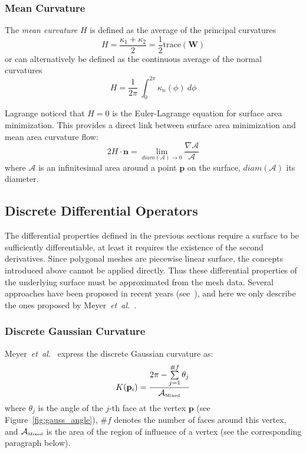 \documentclass{InsightArticle}
\theoremstyle{plain}
\begin{document}
\subsubsection{Mean Curvature}
The \emph{mean curvature} $H$ is defined as the average of the principal curvatures
\begin{equation}
  H = \frac{\kappa_1 + \kappa_2}{2} = \frac{1}{2} \text{trace}(\mathbf{W}) \label{eq:MeanCurvatureDef1}
\end{equation}
or can alternatively be defined as the continuous average of the normal curvatures
\begin{equation}
  H = \frac{1}{2\pi}\ \int_{0}^{2\pi} \kappa_n(\phi)\ d\phi
\end{equation}

Lagrange noticed that $H=0$ is the Euler-Lagrange equation for surface area minimization. This provides a direct link between surface area minimization and mean area curvature flow:
\begin{equation}
  2 H \cdot \mathbf{n} = \lim_{diam(\mathcal{A})\rightarrow 0} \frac{\nabla \mathcal{A}}{\mathcal{A}}
\end{equation}
where $\mathcal{A}$ is an infinitesimal area around a point $\mathbf{p}$ on the surface, $diam(\mathcal{A})$ its diameter.
\subsection{Discrete Differential Operators}
\label{sec:Background:Discrete}

The differential properties defined in the previous sections require a surface to be sufficiently differentiable, at least it requires the existence of the second derivatives. Since polygonal meshes are piecewise linear surface, the concepts introduced above cannot be applied directly. Thus these differential properties of the underlying surface must be approximated from the mesh data. Several approaches have been proposed in recent years (see~\cite{MeshCourse07}), and here we only describe the ones proposed by Meyer~\textit{et~al.}~\cite{Meyer02}.

\subsubsection{Discrete Gaussian Curvature}

Meyer~\textit{et~al.}~\cite{Meyer02} express the discrete Gaussian curvature as:
\begin{equation}
  K(\mathbf{p}_i) = \frac{2\pi - \sum\limits_{j=1}^{\#f}\theta_j}{\mathcal{A}_{\text{\tiny{Mixed}}}} \label{eq:DiscreteGaussianCurvature}
\end{equation}
where $\theta_j$ is the angle of the $j$-th face at the vertex $\mathbf{p}$ (see Figure~\ref{fig:gauss_angle}), $\#f$ denotes the number of faces around this vertex, and $\mathcal{A}_{\text{\tiny{Mixed}}}$ is the area of the region of influence of a vertex (see the corresponding paragraph below).
\end{document}
